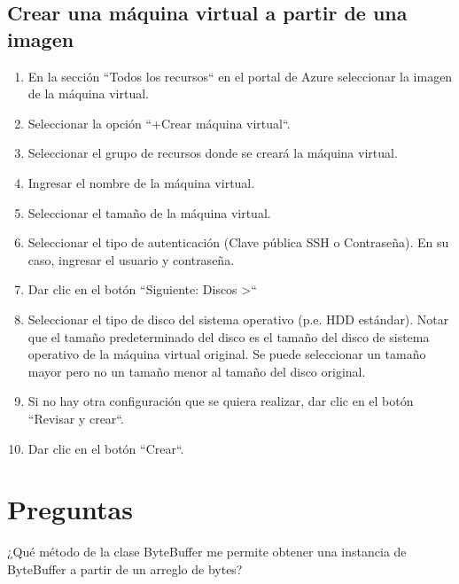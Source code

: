 \section{Crear una máquina virtual a partir de una imagen}

\begin{enumerate}

\item En la sección ``Todos los recursos`` en el portal de Azure seleccionar la imagen de la máquina virtual.

\item Seleccionar la opción ``+Crear máquina virtual``.

\item Seleccionar el grupo de recursos donde se creará la máquina virtual.

\item Ingresar el nombre de la máquina virtual.

\item Seleccionar el tamaño de la máquina virtual.

\item Seleccionar el tipo de autenticación (Clave pública SSH o Contraseña). En su caso, ingresar el usuario y contraseña.

\item Dar clic en el botón ``Siguiente: Discos >``

\item Seleccionar el tipo de disco del sistema operativo (p.e. HDD estándar). Notar que el tamaño predeterminado del disco es el tamaño del disco de sistema operativo de la máquina virtual original. Se puede seleccionar un tamaño mayor pero no un tamaño menor al tamaño del disco original.

\item Si no hay otra configuración que se quiera realizar, dar clic en el botón ``Revisar y crear``.

\item Dar clic en el botón ``Crear``.

\end{enumerate}

\chapter{Preguntas}

\begin{SourceCode}
¿Qué método de la clase ByteBuffer me permite obtener una instancia de ByteBuffer a partir de un arreglo de bytes?
\end{SourceCode}


